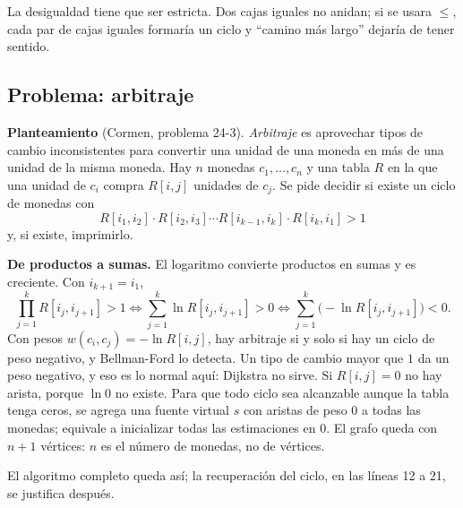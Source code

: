 \documentclass[11pt,letterpaper]{article}
\begin{document}
\begin{ojo}
  La desigualdad tiene que ser estricta. Dos cajas iguales no anidan;
  si se usara $\le$, cada par de cajas iguales formaría un ciclo y
  ``camino más largo'' dejaría de tener sentido.
\end{ojo}


\subsection*{Problema: arbitraje}

\textbf{Planteamiento} (Cormen, problema 24-3). \emph{Arbitraje} es
aprovechar tipos de cambio inconsistentes para convertir una unidad
de una moneda en más de una unidad de la misma moneda. Hay $n$ monedas
$c_1, \dots, c_n$ y una tabla $R$ en la que una unidad de $c_i$
compra $R[i, j]$ unidades de $c_j$. Se pide decidir si existe un ciclo
de monedas con
\[
  R[i_1, i_2] \cdot R[i_2, i_3] \cdots R[i_{k-1}, i_k] \cdot
  R[i_k, i_1] > 1
\]
y, si existe, imprimirlo.

\textbf{De productos a sumas.} El logaritmo convierte productos en
sumas y es creciente. Con $i_{k+1} = i_1$,
\[
  \prod_{j=1}^{k} R[i_j, i_{j+1}] > 1
  \iff \sum_{j=1}^{k} \ln R[i_j, i_{j+1}] > 0
  \iff \sum_{j=1}^{k} \bigl( -\ln R[i_j, i_{j+1}] \bigr) < 0 .
\]
Con pesos $w(c_i, c_j) = -\ln R[i, j]$, hay arbitraje si y solo si
hay un ciclo de peso negativo, y Bellman-Ford lo detecta. Un tipo de
cambio mayor que $1$ da un peso negativo, y eso es lo normal aquí:
Dijkstra no sirve. Si $R[i, j] = 0$ no hay arista, porque $\ln 0$ no
existe. Para que todo ciclo sea alcanzable aunque la tabla tenga
ceros, se agrega una fuente virtual $s$ con aristas de peso $0$ a
todas las monedas; equivale a inicializar todas las estimaciones en
$0$. El grafo queda con $n + 1$ vértices: $n$ es el número de monedas,
no de vértices.

El algoritmo completo queda así; la recuperación del ciclo, en las
líneas 12 a 21, se justifica después.
\end{document}

